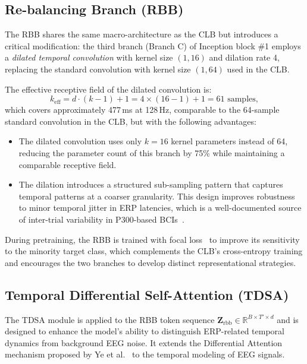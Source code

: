 \subsection{Re-balancing Branch (RBB)}\label{sec:rbb}

The RBB shares the same macro-architecture as the CLB but introduces a critical modification: the third branch (Branch C) of Inception block \#1 employs a \emph{dilated temporal convolution} with kernel size $(1, 16)$ and dilation rate 4, replacing the standard convolution with kernel size $(1, 64)$ used in the CLB.

The effective receptive field of the dilated convolution is:
\begin{equation}\label{eq:dilated_rf}
    k_{\text{eff}} = d \cdot (k - 1) + 1 = 4 \times (16 - 1) + 1 = 61 \text{ samples},
\end{equation}
which covers approximately 477\,ms at 128\,Hz, comparable to the 64-sample standard convolution in the CLB, but with the following advantages:
\begin{itemize}
    \item The dilated convolution uses only $k = 16$ kernel parameters instead of 64, reducing the parameter count of this branch by 75\% while maintaining a comparable receptive field.
    \item The dilation introduces a structured sub-sampling pattern that captures temporal patterns at a coarser granularity. This design improves robustness to minor temporal jitter in ERP latencies, which is a well-documented source of inter-trial variability in P300-based BCIs~\cite{luck2014introduction}.
\end{itemize}

During pretraining, the RBB is trained with focal loss~\cite{lin2017focal} to improve its sensitivity to the minority target class, which complements the CLB's cross-entropy training and encourages the two branches to develop distinct representational strategies.


\subsection{Temporal Differential Self-Attention (TDSA)}\label{sec:tdsa}

The TDSA module is applied to the RBB token sequence $\mathbf{Z}_{\text{rbb}} \in \mathbb{R}^{B \times T' \times d}$ and is designed to enhance the model's ability to distinguish ERP-related temporal dynamics from background EEG noise. It extends the Differential Attention mechanism proposed by Ye et al.~\cite{ye2024differential} to the temporal modeling of EEG signals.


